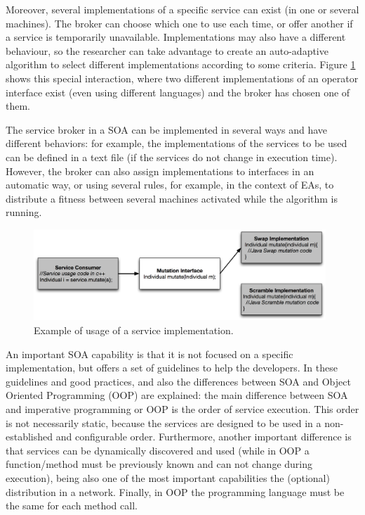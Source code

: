 Moreover, several implementations of a specific service  can exist (in
one or several machines). The broker can choose which one to use  each
time, or offer another if a service is temporarily
unavailable. Implementations  may also have a different behaviour, so
the researcher can take advantage to create an auto-adaptive algorithm
to select different implementations according to some criteria. %
Figure \ref{fig:servicebasic} shows this special interaction, where two different implementations of an operator interface exist (even using different languages) and the broker has chosen one of them.


The service broker in a SOA can be implemented in several ways and have
different behaviors: for example, the implementations of the services to be used can be
defined in a text file (if the services do not change in execution
time). However, the broker can also assign implementations to
interfaces in an automatic way, or using several rules, for example, in the context of EAs,
to distribute a fitness between several machines activated while the
algorithm is running. %


\begin{figure}
\centering
\includegraphics[width=26pc]{gfx/soa/exampleSOA.jpg}
\caption{Example of usage of a service implementation.}
\label{fig:servicebasic}
\end{figure}




An important SOA capability is that it is not focused on a specific
implementation, but offers a set of guidelines to help the
developers. In \citep{Arsanjani2008SOMA} these guidelines and good practices, and also the differences between SOA and Object Oriented
Programming (OOP) are
explained: the main difference between SOA and imperative programming or OOP is the order of service execution. This order is not necessarily static, because the services are designed to be used in a non-established and configurable order. Furthermore, another important difference is that services can be dynamically discovered and used (while in OOP a function/method must be previously known and can not change during execution), being also one of the most important capabilities the (optional) distribution in a network. Finally, in OOP the programming language must be the same for each method call.

